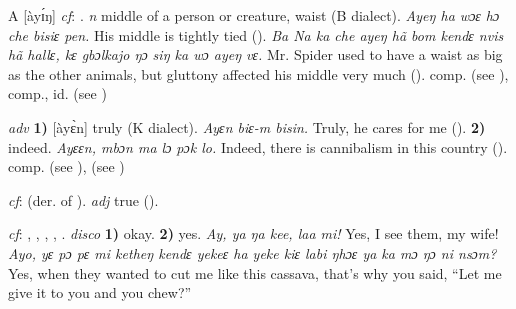 \begin{letter}{A}
 [àyɪ́ŋ] \textit{cf}: . \textit{n} middle of a person or creature, waist (B dialect). \textit{Ayeŋ ha wɔɛ hɔ che bisiɛ pen.} His middle is tightly tied (\citealt{Sumner1921}). \textit{Ba Na ka che ayeŋ hã bom kendɛ nvis hã hallɛ, kɛ gbɔlkajo ŋɔ siŋ ka wɔ ayeŋ vɛ.} Mr. Spider used to have a waist as big as the other animals, but gluttony affected his middle very much (\citealt{Sumner1921}). comp.  (see ), comp., id.  (see )

 \textit{adv} \textbf{1)} [àyɛ̀n] truly (K dialect). \textit{Ayɛn biɛ-m bisin.} Truly, he cares for me (\citealt{Pichl1967}). \textbf{2)} indeed. \textit{Ayɛɛn, mbɔn ma lɔ pɔk lo.} Indeed, there is cannibalism in this country (\citealt{Pichl1967}). comp.  (see ),  (see ) 

 \textit{cf}:  (der. of ). \textit{adj} true (\citealt{Pichl1967}). 

 \textit{cf}: , , , , . \textit{disco} \textbf{1)} okay. \textbf{2)} yes. \textit{Ay, ya ŋa kee, laa mi!} Yes, I see them, my wife! \textit{Ayo, yɛ pɔ pɛ mi ketheŋ kendɛ yekeɛ ha yeke kiɛ labi ŋhɔɛ ya ka mɔ ŋɔ ni nsɔm?} Yes, when they wanted to cut me like this cassava, that's why you said, “Let me give it to you and you chew?”

\end{letter}
